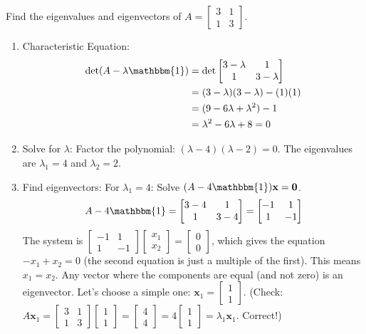 \documentclass[11pt]{article}
\newcommand{\x}{\mathbf{x}}
\newcommand{\id}{\mathbbm{1}}
\begin{document}
\begin{example}
Find the eigenvalues and eigenvectors of $A = \begin{bmatrix} 3 & 1 \\ 1 & 3 \end{bmatrix}$.

\begin{enumerate}
    \item Characteristic Equation:
    \begin{align*} \det(A - \lambda \id) &= \det \begin{bmatrix} 3-\lambda & 1 \\ 1 & 3-\lambda \end{bmatrix} \\ &= (3-\lambda)(3-\lambda) - (1)(1) \\ &= (9 - 6\lambda + \lambda^2) - 1 \\ &= \lambda^2 - 6\lambda + 8 = 0 \end{align*}
    \item Solve for $\lambda$: Factor the polynomial: $(\lambda - 4)(\lambda - 2) = 0$. The eigenvalues are $\lambda_1 = 4$ and $\lambda_2 = 2$.
    \item Find eigenvectors:
    For $\lambda_1 = 4$: Solve $(A - 4\id)\x = \mathbf{0}$.
        \[ A - 4\id = \begin{bmatrix} 3-4 & 1 \\ 1 & 3-4 \end{bmatrix} = \begin{bmatrix} -1 & 1 \\ 1 & -1 \end{bmatrix} \]
        The system is $\begin{bmatrix} -1 & 1 \\ 1 & -1 \end{bmatrix} \begin{bmatrix} x_1 \\ x_2 \end{bmatrix} = \begin{bmatrix} 0 \\ 0 \end{bmatrix}$, which gives the equation $-x_1 + x_2 = 0$ (the second equation is just a multiple of the first). This means $x_1 = x_2$.
        Any vector where the components are equal (and not zero) is an eigenvector. Let's choose a simple one: $\x_1 = \begin{bmatrix} 1 \\ 1 \end{bmatrix}$.
        (Check: $A\x_1 = \begin{bmatrix} 3 & 1 \\ 1 & 3 \end{bmatrix} \begin{bmatrix} 1 \\ 1 \end{bmatrix} = \begin{bmatrix} 4 \\ 4 \end{bmatrix} = 4 \begin{bmatrix} 1 \\ 1 \end{bmatrix} = \lambda_1 \x_1$. Correct!)


\end{enumerate}
\end{example}
\end{document}
